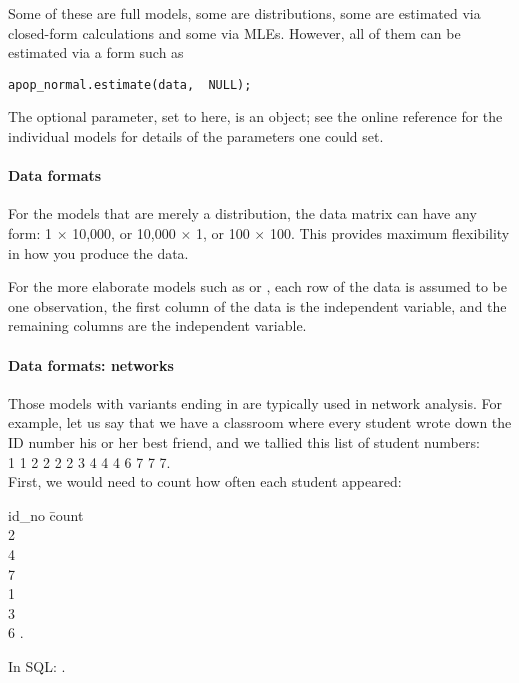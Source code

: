 Some of these are full models, some are distributions, some are
estimated via closed-form calculations and some via MLEs. However, all
of them can be estimated via a form such as
\begin{lstlisting}
apop_normal.estimate(data,  NULL);
\end{lstlisting}

The optional parameter, set to  here,
is an  object; see
the online reference for the individual models for details of the
parameters one could set.

\paragraph{Data formats} \label{dataformats} 
For the models that are merely a distribution, the data matrix can have
any form: 1 $\times$ 10,000, or 10,000 $\times$ 1, or 100 $\times$ 100.
This provides maximum flexibility in how you produce the data.

For the more elaborate models such as  or
, each row of the data is assumed to be one
observation, the first column of the data is the independent
variable, and the remaining columns are the independent variable.

\paragraph{\treesymbol{} Data formats: networks} 
Those models with variants ending in  are typically used
in network analysis. For example, let us say that we have a classroom
where every student wrote down the ID number his or her best friend,
and we tallied this list of student numbers:\\
1 1 2 2 2 2 3 4 4 4 6 7 7 7.\\ 
First, we would need to count how often each student appeared:\\

\begin{tabbing}
id\_no \= count\\
2 \\
4 \\
7 \\
1 \\
3 \\
6 .
\end{tabbing}
In SQL: .

